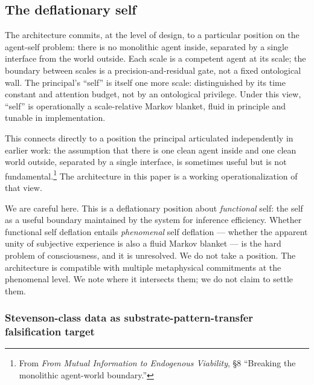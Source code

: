 \documentclass[11pt]{article}
\begin{document}
\subsection{The deflationary self}

The architecture commits, at the level of design, to a particular position on the agent-self problem: there is no monolithic agent inside, separated by a single interface from the world outside. Each scale is a competent agent at its scale; the boundary between scales is a precision-and-residual gate, not a fixed ontological wall. The principal's ``self'' is itself one more scale: distinguished by its time constant and attention budget, not by an ontological privilege. Under this view, ``self'' is operationally a scale-relative Markov blanket, fluid in principle and tunable in implementation.

This connects directly to a position the principal articulated independently in earlier work: the assumption that there is one clean agent inside and one clean world outside, separated by a single interface, is sometimes useful but is not fundamental.\footnote{From \emph{From Mutual Information to Endogenous Viability}, §8 ``Breaking the monolithic agent-world boundary.''} The architecture in this paper is a working operationalization of that view.

We are careful here. This is a deflationary position about \emph{functional} self: the self as a useful boundary maintained by the system for inference efficiency. Whether functional self deflation entails \emph{phenomenal} self deflation --- whether the apparent unity of subjective experience is also a fluid Markov blanket --- is the hard problem of consciousness, and it is unresolved. We do not take a position. The architecture is compatible with multiple metaphysical commitments at the phenomenal level. We note where it intersects them; we do not claim to settle them.

\subsubsection{Stevenson-class data as substrate-pattern-transfer falsification target}
\end{document}
